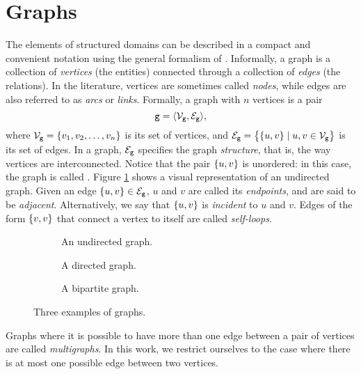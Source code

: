 \section{Graphs}\label{sec:graphs}
The elements of structured domains can be described in a compact and convenient notation using the general formalism of  \citep{bondy1976graph}. Informally, a graph is a collection of \emph{vertices} (the entities) connected through a collection of \emph{edges} (the relations). In the literature, vertices are sometimes called \emph{nodes}, while edges are also referred to as \emph{arcs} or \emph{links}. Formally, a graph with $n$ vertices is a pair
$$\Graph{g} =\langle \Nodes{g}, \Edges{g}\rangle,$$
where $\Nodes{g}= \Set{v_1, v_2, \ldots, v_n}$ is its set of vertices, and $\Edges{g} = \Set{\{u, v\} \mid u, v \in \Nodes{g}}$ is its set of edges. In a graph, $\Edges{g}$  specifies the graph \emph{structure}, that is, the way vertices are interconnected. Notice that the pair $\left\{ u,v \right\}$ is unordered: in this case, the graph is called . Figure \ref{fig:undirected-graph} shows a visual representation of an undirected graph.
Given an edge $\Set{u, v} \in \Edges{g}$, $u$ and $v$ are called its \emph{endpoints}, and are said to be \emph{adjacent}. Alternatively, we say that $\left\{ u, v \right\}$ is \emph{incident} to $u$ and $v$. Edges of the form $\left\{ v,v \right\}$ that connect a vertex to itself are called \emph{self-loops}.
\begin{figure*}
    \begin{subfigure}[b]{0.38\linewidth}
        \centering
        \resizebox{.9\textwidth}{!}{}
        \caption{An undirected graph.}
        \label{fig:undirected-graph}
    \end{subfigure}
    \begin{subfigure}[b]{0.32\linewidth}
        \centering
        \resizebox{.9\textwidth}{!}{}
        \caption{A directed graph.}
        \label{fig:directed-graph}
    \end{subfigure}
    \begin{subfigure}[b]{0.25\linewidth}
        \centering
        \resizebox{.9\textwidth}{!}{}
        \caption{A bipartite graph.}
        \label{fig:bipartite-graph}
    \end{subfigure}
    \caption{Three examples of graphs.}
\end{figure*}
Graphs where it is possible to have more than one edge between a pair of vertices are called \emph{multigraphs}. In this work, we restrict ourselves to the case where there is at most one possible edge between two vertices.

